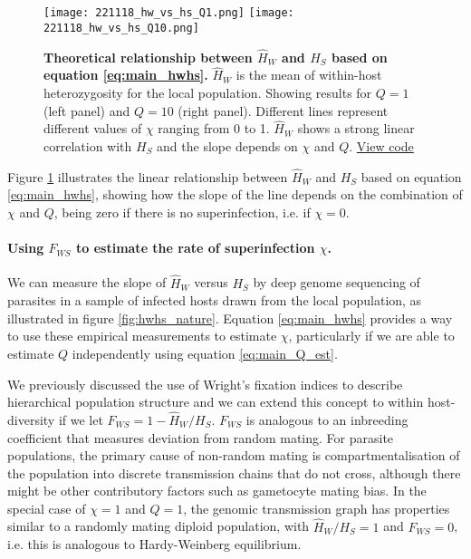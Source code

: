 \documentclass[_main.tex]{subfiles}
\begin{document}
\begin{figure}[h!]
\centering
\texttt{[image: 221118\_hw\_vs\_hs\_Q1.png]}
\texttt{[image: 221118\_hw\_vs\_hs\_Q10.png]}
\caption{\textbf{Theoretical relationship between $\widehat{H}_W$ and $H_S$ based on equation \ref{eq:main_hwhs}.}  $\widehat{H}_W$ is the mean of within-host heterozygosity for the local population.  Showing results for $Q = 1$ (left panel) and $Q = 10$ (right panel).  Different lines represent different values of $\chi$ ranging from 0 to 1.  $\widehat{H}_W$ shows a strong linear correlation with $H_S$ and the slope depends on $\chi$ and $Q$.
\href{https://github.com/d-kwiat/gtg/blob/main/hw_vs_hs.ipynb}{View code}
}
\label{fig:hw_vs_hs_model}
\end{figure}

Figure \ref{fig:hw_vs_hs_model} illustrates the linear relationship between $\widehat{H}_W$ and $H_S$ based on equation \ref{eq:main_hwhs}, showing how the slope of the line depends on the combination of $\chi$ and $Q$, being zero if there is no superinfection, i.e. if $\chi = 0$. 


\paragraph{Using $F_{WS}$ to estimate the rate of superinfection $\chi$.}

We can measure the slope of $\widehat{H}_W$ versus $H_S$ by deep genome sequencing of parasites in a sample of infected hosts drawn from the local population, as illustrated in figure \ref{fig:hwhs_nature}.  Equation \ref{eq:main_hwhs} provides a way to use these empirical measurements to estimate $\chi$, particularly if we are able to estimate $Q$ independently using equation \ref{eq:main_Q_est}.

We previously discussed the use of Wright's fixation indices to describe hierarchical population structure and we can extend this concept to within host-diversity if we let $F_{WS} = 1 - \widehat{H}_W / H_S$.  $F_{WS}$ is analogous to an inbreeding coefficient that measures deviation from random mating.  For parasite populations, the primary cause of non-random mating is compartmentalisation of the population into discrete transmission chains that do not cross, although there might be other contributory factors such as gametocyte mating bias.  In the special case of $\chi = 1$ and $Q = 1$, the genomic transmission graph has properties similar to a randomly mating diploid population, with $\widehat{H}_W / H_S = 1$ and $F_{WS} = 0$, i.e. this is analogous to Hardy-Weinberg equilibrium.
\end{document}
